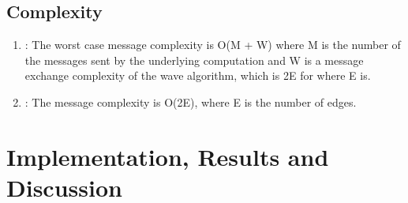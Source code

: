 \documentclass[letterpaper,10pt,english]{sphinxmanual}
\begin{document}
\subsection{Complexity}
\label{\detokenize{docs/ShavitFrancez/algorithm:complexity}}\begin{enumerate}
%
\item {} 
\sphinxAtStartPar
{\hyperref[\detokenize{docs/ShavitFrancez/algorithm:shavitfrancezterminationdetectionalgorithm}]{}}: The worst case message complexity  is O(M + W) where M is the number of the messages sent by the underlying computation and W is a message exchange complexity of the wave algorithm, which is 2E for {\hyperref[\detokenize{docs/ShavitFrancez/algorithm:echoalgorithm}]{}} where E is. 

\item {} 
\sphinxAtStartPar
{\hyperref[\detokenize{docs/ShavitFrancez/algorithm:echoalgorithm}]{}}: The message complexity is O(2E), where E is the number of edges. 

\end{enumerate}

\sphinxstepscope


\section{Implementation, Results and Discussion}
\label{\detokenize{docs/ShavitFrancez/results:implementation-results-and-discussion}}\label{\detokenize{docs/ShavitFrancez/results::doc}}
\end{document}
